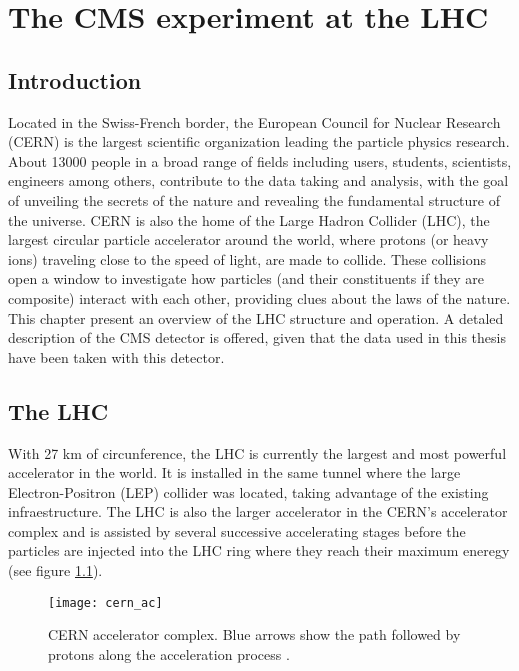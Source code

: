 \chapter{The CMS experiment at the LHC}\label{ch:cms}

\section{Introduction}\label{sec:cms_intro}
\noindent Located in the Swiss-French border, the European Council for Nuclear Research (CERN) is the largest scientific organization leading the particle physics research. About 13000 people in a broad range of fields including users, students, scientists, engineers among others, contribute to the data taking and analysis, with the goal of unveiling the secrets of the nature and revealing the fundamental structure of the universe. CERN is also the home of the Large Hadron Collider (LHC), the largest circular particle accelerator around the world, where protons (or heavy ions) traveling close to the speed of light, are made to collide. These collisions open a window to investigate how particles (and their constituents if they are composite) interact with each other, providing clues about the laws of the nature. This chapter present an overview of the LHC structure and operation. A detaled description of the CMS detector is offered, given that the data used in this thesis have been taken with this detector.     

\section{The LHC}

\noindent With 27 km of circunference, the LHC is currently the largest and most powerful accelerator in the world. It is installed in the same tunnel where the large Electron-Positron (LEP) collider was located, taking advantage of the existing infraestructure. The LHC is also the larger accelerator in the CERN's accelerator complex and is assisted by several successive accelerating stages before the particles are injected into the LHC ring where they reach their maximum eneregy (see figure \ref{fig:cern}).

\begin{figure}[!h]
  \centering
  \texttt{[image: cern\_ac]}
  \caption[CERN accelerator complex]{CERN accelerator complex. Blue arrows show the path followed by protons along the acceleration process \cite{cern}.}\label{fig:cern}
\end{figure}

